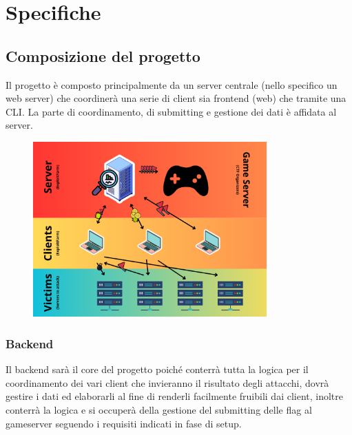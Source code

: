 \documentclass[11pt]{article}
\begin{document}
\section{Specifiche}
\subsection{Composizione del progetto}
Il progetto è composto principalmente da un server centrale (nello specifico un web server) che coordinerà una serie di client sia frontend (web) che tramite una CLI. La parte di coordinamento, di submitting e gestione dei dati è affidata al server.
    \begin{figure}[H]
    	\centering
    	\includegraphics[width=0.8\textwidth]{general_layout.png}
	\end{figure}
\subsubsection{Backend}
Il backend sarà il core del progetto poiché conterrà tutta la logica per il coordinamento dei vari client che invieranno il risultato degli attacchi, dovrà gestire i dati ed elaborarli al fine di renderli facilmente fruibili dai client, inoltre conterrà la logica e si occuperà della gestione del submitting delle flag al gameserver seguendo i requisiti indicati in fase di setup.
\end{document}
